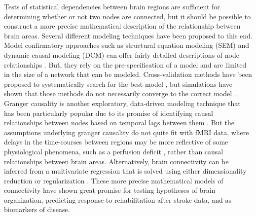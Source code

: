 Tests of statistical dependencies between brain regions are sufficient for determining whether or not two nodes are connected, but it should be possible to construct a more precise mathematical description of the relationship between brain areas\cite{Friston1994}. Several different modeling techniques have been proposed to this end. Model confirmatory approaches such as structural equation modeling (SEM)\cite{Buchel1997} and dynamic causal modeling (DCM)\cite{Friston2003} can offer fairly detailed descriptions of node relationships . But, they rely on the pre-specification of a model and are limited in the size of a network that can be modeled. Cross-validation methods have been proposed to systematically search for the best model \cite{Zhuang2005,Penny2010,James2009}, but simulations have shown that those methods do not necessarily converge to the correct model \cite{Lohmann2012}. Granger causality is another exploratory, data-driven modeling technique that has been particularly popular due to its promise of identifying causal relationships between nodes based on temporal lags between them \cite{Deshpande2011}. But the assumptions underlying granger causality do not quite fit with fMRI data\cite{Smith2011}, where delays in the time-courses between regions may be more reflective of some physiological phenomena, such as a perfusion deficit \cite{Lv2013}, rather than causal relationships between brain areas. Alternatively, brain connectivity can be inferred from a multivariate regression  that is solved using either dimensionality reduction\cite{Friston1994} or regularization \cite{Craddock2013b}. These more precise mathematical models of connectivity have shown great promise for testing hypotheses of brain organization\cite{Craddock2013b}, predicting response to rehabilitation after stroke data\cite{James2009b}, and as biomarkers of disease\cite{Brodersen2011}.

